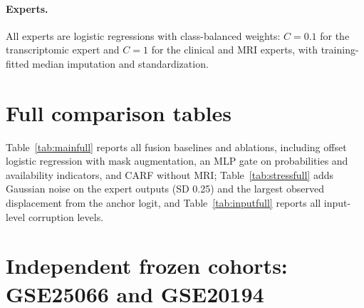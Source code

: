 \documentclass[runningheads]{llncs}
\begin{document}
\paragraph{Experts.} All experts are logistic regressions with class-balanced weights: $C=0.1$ for the transcriptomic expert and $C=1$ for the clinical and MRI experts, with training-fitted median imputation and standardization.

\section{Full comparison tables}

Table~\ref{tab:mainfull} reports all fusion baselines and ablations, including offset logistic regression with mask augmentation, an MLP gate on probabilities and availability indicators, and CARF without MRI; Table~\ref{tab:stressfull} adds Gaussian noise on the expert outputs (SD 0.25) and the largest observed displacement from the anchor logit, and Table~\ref{tab:inputfull} reports all input-level corruption levels.

\begin{table}[h]
\centering
\caption{Full version of the main comparison table. AP denotes average precision.}
\label{tab:mainfull}
\small
{}
\end{table}

\begin{table}[h]
\centering
\caption{Full version of the stress table, with output-level noise and the largest absolute change from the anchor logit, $\max|z-a|$.}
\label{tab:stressfull}
\small
{}
\end{table}

\begin{table}[h]
\centering
\caption{External AUROC under all input-level corruption levels (mean of 30 realizations). RNA drop: fraction of genes set to missing before rank normalization; RNA shift: fraction of genes shifted and shift size in log-ratio units; MRI noise: Gaussian noise in training standard deviations; MRI drop: fraction of features set to missing.}
\label{tab:inputfull}
\small
{}
\end{table}

\section{Independent frozen cohorts: GSE25066 and GSE20194}
\end{document}
